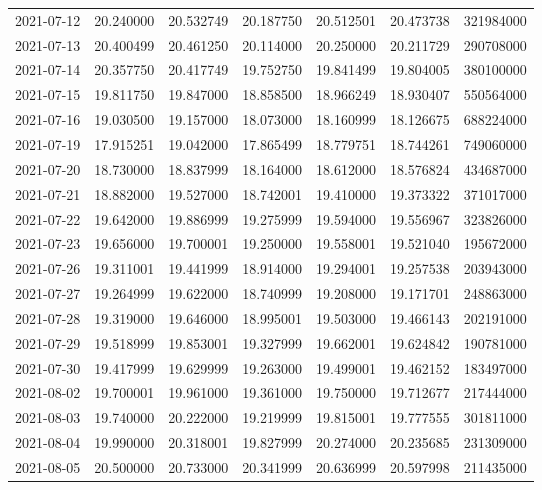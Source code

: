 \begin{tabular}{lrrrrrr}
2021-07-12 &   20.240000 &   20.532749 &   20.187750 &   20.512501 &   20.473738 &   321984000 \\
2021-07-13 &   20.400499 &   20.461250 &   20.114000 &   20.250000 &   20.211729 &   290708000 \\
2021-07-14 &   20.357750 &   20.417749 &   19.752750 &   19.841499 &   19.804005 &   380100000 \\
2021-07-15 &   19.811750 &   19.847000 &   18.858500 &   18.966249 &   18.930407 &   550564000 \\
2021-07-16 &   19.030500 &   19.157000 &   18.073000 &   18.160999 &   18.126675 &   688224000 \\
2021-07-19 &   17.915251 &   19.042000 &   17.865499 &   18.779751 &   18.744261 &   749060000 \\
2021-07-20 &   18.730000 &   18.837999 &   18.164000 &   18.612000 &   18.576824 &   434687000 \\
2021-07-21 &   18.882000 &   19.527000 &   18.742001 &   19.410000 &   19.373322 &   371017000 \\
2021-07-22 &   19.642000 &   19.886999 &   19.275999 &   19.594000 &   19.556967 &   323826000 \\
2021-07-23 &   19.656000 &   19.700001 &   19.250000 &   19.558001 &   19.521040 &   195672000 \\
2021-07-26 &   19.311001 &   19.441999 &   18.914000 &   19.294001 &   19.257538 &   203943000 \\
2021-07-27 &   19.264999 &   19.622000 &   18.740999 &   19.208000 &   19.171701 &   248863000 \\
2021-07-28 &   19.319000 &   19.646000 &   18.995001 &   19.503000 &   19.466143 &   202191000 \\
2021-07-29 &   19.518999 &   19.853001 &   19.327999 &   19.662001 &   19.624842 &   190781000 \\
2021-07-30 &   19.417999 &   19.629999 &   19.263000 &   19.499001 &   19.462152 &   183497000 \\
2021-08-02 &   19.700001 &   19.961000 &   19.361000 &   19.750000 &   19.712677 &   217444000 \\
2021-08-03 &   19.740000 &   20.222000 &   19.219999 &   19.815001 &   19.777555 &   301811000 \\
2021-08-04 &   19.990000 &   20.318001 &   19.827999 &   20.274000 &   20.235685 &   231309000 \\
2021-08-05 &   20.500000 &   20.733000 &   20.341999 &   20.636999 &   20.597998 &   211435000 \\

\end{tabular}
